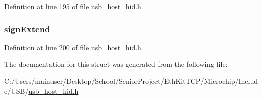 Definition at line 195 of file usb\+\_\+host\+\_\+hid.\+h.

\hypertarget{struct___h_i_d___d_a_t_a___d_e_t_a_i_l_s_a1b394dd5481c225f2232a7ac343367af}{}
\subsubsection[{sign\+Extend}]{ sign\+Extend}\label{struct___h_i_d___d_a_t_a___d_e_t_a_i_l_s_a1b394dd5481c225f2232a7ac343367af}


Definition at line 200 of file usb\+\_\+host\+\_\+hid.\+h.



The documentation for this struct was generated from the following file\+:\begin{DoxyCompactItemize}
\item 
C\+:/\+Users/mainuser/\+Desktop/\+School/\+Senior\+Project/\+Eth\+Kit\+T\+C\+P/\+Microchip/\+Include/\+U\+S\+B/\hyperlink{usb__host__hid_8h}{usb\+\_\+host\+\_\+hid.\+h}\end{DoxyCompactItemize}

